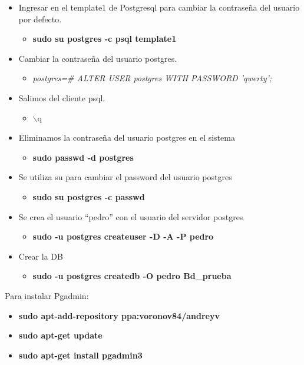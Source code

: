 \begin{itemize}
\item Ingresar en el template1 de Postgresql para cambiar la contraseña del usuario por defecto.
\begin{itemize}
\item \textbf{sudo su postgres -c psql template1}
\end{itemize}

\item Cambiar la contraseña del usuario postgres.
\begin{itemize}
\item \textit{postgres=\# ALTER USER postgres WITH PASSWORD 'qwerty';}
\end{itemize}

\item Salimos del cliente psql.
\begin{itemize}
\item $\backslash$q
\end{itemize}

\item Eliminamos la contraseña del usuario postgres en el sistema
\begin{itemize}
\item \textbf{sudo passwd -d postgres}
\end{itemize}

\item Se utiliza su para cambiar el password del usuario postgres
\begin{itemize}
\item \textbf{sudo su postgres -c passwd}
\end{itemize}

\item Se crea el usuario “pedro” con el usuario del servidor postgres
\begin{itemize}
\item \textbf{sudo -u postgres createuser -D -A -P pedro}
\end{itemize}

\item Crear la DB 
\begin{itemize}
\item \textbf{sudo -u postgres createdb -O pedro Bd\_prueba}
\end{itemize}

\end{itemize}

Para instalar Pgadmin:

\begin{itemize}
\item \textbf{sudo apt-add-repository ppa:voronov84/andreyv}
\item \textbf{sudo apt-get update}
\item \textbf{sudo apt-get install pgadmin3}
\end{itemize}

